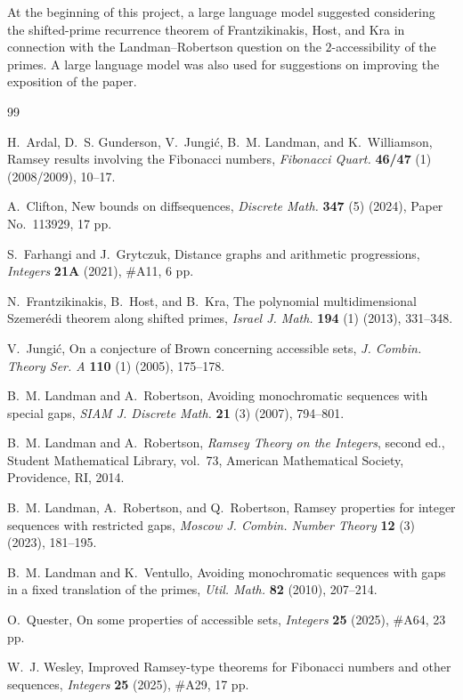 \documentclass{amsart}
\theoremstyle{definition}
\begin{document}
\vskip20pt At the beginning of this project, a large language model suggested considering the shifted-prime recurrence theorem of Frantzikinakis, Host, and Kra \cite{frantzikinakis2013polynomial} in connection with the Landman--Robertson question on the $2$-accessibility of the primes. A large language model was also used for suggestions on improving the exposition of the paper.



\begin{thebibliography}{99}\footnotesize
\providecommand{\url}[1]{\texttt{#1}}
\providecommand{\urlprefix}{URL }

H.~Ardal, D.~S. Gunderson, V.~Jungi{\'c}, B.~M. Landman, and K.~Williamson,
Ramsey results involving the {Fibonacci} numbers,
\textit{Fibonacci Quart.} \textbf{46/47} (1) (2008/2009), 10--17.

A.~Clifton,
New bounds on diffsequences,
\textit{Discrete Math.} \textbf{347} (5) (2024), Paper No.~113929, 17 pp.

S.~Farhangi and J.~Grytczuk,
Distance graphs and arithmetic progressions,
\textit{Integers} \textbf{21A} (2021), \#A11, 6 pp.

N.~Frantzikinakis, B.~Host, and B.~Kra,
The polynomial multidimensional Szemer{\'e}di theorem along shifted primes,
\textit{Israel J. Math.} \textbf{194} (1) (2013), 331--348.

V.~Jungi{\'c},
On a conjecture of {Brown} concerning accessible sets,
\textit{J. Combin. Theory Ser. A} \textbf{110} (1) (2005), 175--178.

B.~M. Landman and A.~Robertson,
Avoiding monochromatic sequences with special gaps,
\textit{SIAM J. Discrete Math.} \textbf{21} (3) (2007), 794--801.

B.~M. Landman and A.~Robertson,
\textit{Ramsey Theory on the Integers},
second ed., Student Mathematical Library, vol.~73,
American Mathematical Society, Providence, RI, 2014.

B.~M. Landman, A.~Robertson, and Q.~Robertson,
Ramsey properties for integer sequences with restricted gaps,
\textit{Moscow J. Combin. Number Theory} \textbf{12} (3) (2023), 181--195.

B.~M. Landman and K.~Ventullo,
Avoiding monochromatic sequences with gaps in a fixed translation of the primes,
\textit{Util. Math.} \textbf{82} (2010), 207--214.

O.~Quester,
On some properties of accessible sets,
\textit{Integers} \textbf{25} (2025), \#A64, 23 pp.

W.~J. Wesley,
Improved {Ramsey}-type theorems for {Fibonacci} numbers and other sequences,
\textit{Integers} \textbf{25} (2025), \#A29, 17 pp.

\end{thebibliography}
\end{document}

